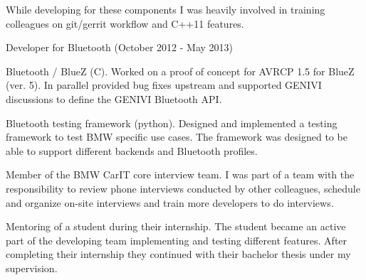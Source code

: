 \documentclass[alan.tex]{subfiles}
\begin{document}
\begin{my_desc}
\begin{my_bullets}
          \item While developing for these components I was heavily involved in training colleagues on git/gerrit
              workflow and C++11 features.
        \end{my_bullets}
      \item[Developer] for Bluetooth (October 2012 - May 2013)
        \begin{my_bullets}
        \item Bluetooth / BlueZ (C).  Worked on a proof of concept for AVRCP 1.5 for BlueZ (ver. 5).
            In parallel provided bug fixes upstream and supported GENIVI discussions to define the
            GENIVI Bluetooth API.
          \item Bluetooth testing framework (python). Designed and implemented a testing framework to
            test BMW specific use cases. The framework was designed to be able to support different backends and
            Bluetooth profiles.
        \end{my_bullets}
      \item[Member] of the BMW CarIT core interview team. I was part of a team with the responsibility to review phone interviews
        conducted by other colleagues, schedule and organize on-site interviews and train more developers to do interviews.
      \item[Mentoring] of a student during their internship. The student became an active part of the developing
        team implementing and testing different features. After completing their internship they continued with their bachelor thesis
        under my supervision.
    \end{my_desc}
\end{document}
